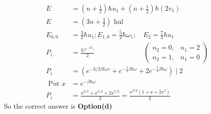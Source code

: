 \begin{answer}
	\begin{align*}
	E&=\left(n+\frac{1}{2}\right) \hbar u_{1}+\left(n+\frac{1}{2}\right) \hbar\left(2 v_{1}\right)\\
	E&=\left(3 n+\frac{3}{2}\right) \text { hul }\\
	E_{0,0}&=\frac{3}{2} \hbar u_{1} ; E_{1,0}=\frac{5}{2} \hbar \omega_{1}; \quad E_{2}=\frac{7}{2} \hbar u_{1}\\
	P_{i}&=\frac{g_{i} e^{-\beta \varepsilon_{i}}}{2}\hspace{3cm}\left(\begin{array}{ll}
	n_{2}=0, & n_{1}=2 \\
	n_{2}=1, & n_{1}=0
	\end{array}\right)\\
	P_{i}&=\left(e^{-3 / 2 \beta t \omega e}+e^{-\frac{5}{2} \beta \hbar \omega}+2 e^{-\frac{7}{2} \beta \hbar \omega}\right) \mid 2\\
	\text { Put } x&=e^{-\beta \hbar \omega}\\
	P_{i}&=\frac{x^{3 / 2}+x^{5 / 2}+2 x^{7 / 2}}{2}=\frac{x^{3 / 2}\left(1+x+2 x^{2}\right)}{2}
	\end{align*}
		So the correct answer is \textbf{Option(d)}
\end{answer}
